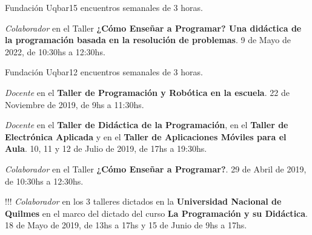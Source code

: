 \begin{enumerate}[leftmargin=0.8cm]
{\begin{itemize}[leftmargin=0.2cm]
      {Fundación Uqbar}{15 encuentros semanales de 3 horas.}

      {\emph{Colaborador} en el Taller \textbf{¿Cómo Enseñar a Programar? Una didáctica de la programación basada en la resolución de problemas}.}
      {9 de Mayo de 2022, de 10:30hs a 12:30hs.}

      {Fundación Uqbar}{12 encuentros semanales de 3 horas.}

      {\emph{Docente} en el \textbf{Taller de Programación y Robótica en la escuela}.}
      {22 de Noviembre de 2019, de 9hs a 11:30hs.}

      {\emph{Docente} en el \textbf{Taller de Didáctica de la Programación}, en el \textbf{Taller de Electrónica Aplicada} y
        en el \textbf{Taller de Aplicaciones Móviles para el Aula}.}
      {10, 11 y 12 de Julio de 2019, de 17hs a 19:30hs.}

      {\emph{Colaborador} en el Taller \textbf{¿Cómo Enseñar a Programar?}.}
      {29 de Abril de 2019, de 10:30hs a 12:30hs.}

!!!      %
      {\emph{Colaborador} en los 3 talleres dictados en la \textbf{Universidad Nacional de Quilmes} en el marco del dictado del curso \textbf{La Programación y su Didáctica}.}
      {18 de Mayo de 2019, de 13hs a 17hs y 15 de Junio de 9hs a 17hs.}


\end{itemize}}
\end{enumerate}
